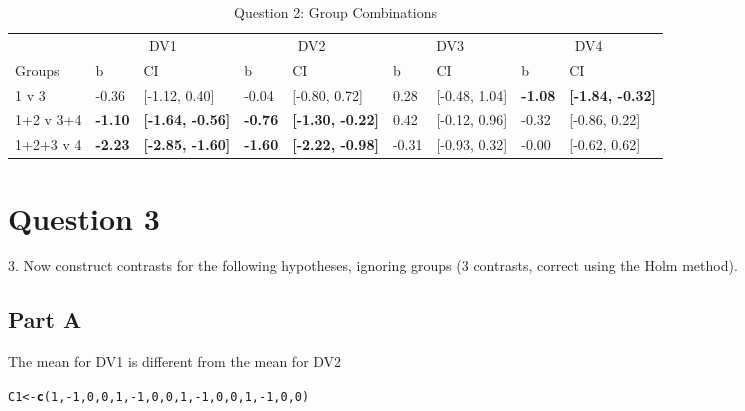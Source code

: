 \documentclass{article}\usepackage[]{graphicx}\usepackage[]{color}
\makeatletter
\newcommand{\hlnum}[1]{\textcolor[rgb]{0.686,0.059,0.569}{#1}}%
\newcommand{\hlopt}[1]{\textcolor[rgb]{0,0,0}{#1}}%
\newcommand{\hlstd}[1]{\textcolor[rgb]{0.345,0.345,0.345}{#1}}%
\newcommand{\hlkwb}[1]{\textcolor[rgb]{0.69,0.353,0.396}{#1}}%
\newcommand{\hlkwd}[1]{\textcolor[rgb]{0.737,0.353,0.396}{\textbf{#1}}}%
\newenvironment{kframe}{%
 \def\at@end@of@kframe{}%
 \ifinner\ifhmode%
  \def\at@end@of@kframe{\end{minipage}}%
  \begin{minipage}{\columnwidth}%
 \fi\fi%
 \def\FrameCommand##1{\hskip\@totalleftmargin \hskip-\fboxsep
 \colorbox{shadecolor}{##1}\hskip-\fboxsep
     \hskip-\linewidth \hskip-\@totalleftmargin \hskip\columnwidth}%
 \MakeFramed {\advance\hsize-\width
   \@totalleftmargin\z@ \linewidth\hsize
   \@setminipage}}%
 {\par\unskip\endMakeFramed%
 \at@end@of@kframe}
\newenvironment{knitrout}{}{} %
\makeatother
\begin{document}
\begin{knitrout}
\begin{table}
\caption{\label{tab:unnamed-chunk-10}Question 2: Group Combinations}
\centering
\begin{tabular}[t]{lllllllll}
\toprule
\multicolumn{1}{c}{ } & \multicolumn{2}{c}{DV1} & \multicolumn{2}{c}{DV2} & \multicolumn{2}{c}{DV3} & \multicolumn{2}{c}{DV4} \\
\cmidrule(l{2pt}r{2pt}){2-3} \cmidrule(l{2pt}r{2pt}){4-5} \cmidrule(l{2pt}r{2pt}){6-7} \cmidrule(l{2pt}r{2pt}){8-9}
Groups & b & CI & b & CI & b & CI & b & CI\\
\midrule
1 v 3 & -0.36 & [-1.12, 0.40] & -0.04 & [-0.80, 0.72] & 0.28 & [-0.48, 1.04] & \textbf{-1.08} & \textbf{[-1.84, -0.32]}\\
1+2 v 3+4 & \textbf{-1.10} & \textbf{[-1.64, -0.56]} & \textbf{-0.76} & \textbf{[-1.30, -0.22]} & 0.42 & [-0.12, 0.96] & -0.32 & [-0.86, 0.22]\\
1+2+3 v 4 & \textbf{-2.23} & \textbf{[-2.85, -1.60]} & \textbf{-1.60} & \textbf{[-2.22, -0.98]} & -0.31 & [-0.93, 0.32] & -0.00 & [-0.62, 0.62]\\
\bottomrule
\end{tabular}
\end{table}


\end{knitrout}


\section{Question 3}
3. Now construct contrasts for the following hypotheses, ignoring groups (3 contrasts, correct using the Holm method).

\subsection{Part A}
The mean for DV1 is different from the mean for DV2
\begin{knitrout}
\color{fgcolor}\begin{kframe}
\begin{alltt}
\hlstd{C1} \hlkwb{<-} \hlkwd{c}\hlstd{(}\hlnum{1}\hlstd{,}\hlopt{-}\hlnum{1}\hlstd{,}\hlnum{0}\hlstd{,}\hlnum{0}\hlstd{,} \hlnum{1}\hlstd{,}\hlopt{-}\hlnum{1}\hlstd{,}\hlnum{0}\hlstd{,}\hlnum{0}\hlstd{,} \hlnum{1}\hlstd{,}\hlopt{-}\hlnum{1}\hlstd{,}\hlnum{0}\hlstd{,}\hlnum{0}\hlstd{,} \hlnum{1}\hlstd{,}\hlopt{-}\hlnum{1}\hlstd{,}\hlnum{0}\hlstd{,}\hlnum{0}\hlstd{)}
\end{alltt}
\end{kframe}
\end{knitrout}
\end{document}
